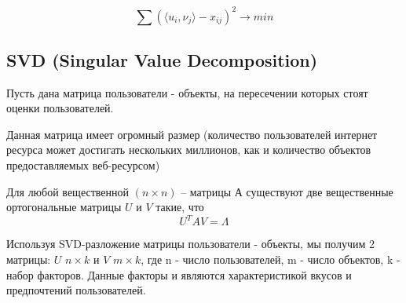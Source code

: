 \begin{equation}
	\sum (\langle u_i, \nu_j \rangle - x_{ij})^{2} \rightarrow min
\end{equation}

\subsection{SVD (Singular Value Decomposition)}

Пусть дана матрица пользователи - объекты, на пересечении которых стоят оценки пользователей.

Данная матрица имеет огромный размер (количество пользователей интернет ресурса может достигать нескольких миллионов, как и количество объектов предоставляемых веб-ресурсом)

Для любой вещественной $(n \times n)$ – матрицы $А$ существуют две вещественные ортогональные матрицы $U$ и $V$ такие, что 
\begin{equation}
	U^{T}AV = \varLambda 
\end{equation} \cite{svd}

Используя SVD-разложение матрицы пользователи - объекты, мы получим 2 матрицы: $U$ $n \times  k$  и $V$ $m \times k$, где
n - число пользователей, m -  число объектов, k - набор факторов.
Данные факторы и являются характеристикой вкусов и предпочтений пользователей.




%
